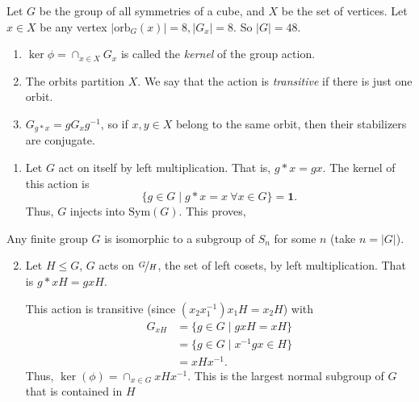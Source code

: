\begin{example}
    Let \(G\) be the group of all symmetries of a cube, and \(X\) be the set of vertices. Let \(x \in X\) be any vertex \(\left\vert \mathrm{orb}_G(x)\right\vert = 8, \left\vert G_x \right\vert =8  \). So \(\left\vert G \right\vert = 48\).
\end{example}
\begin{remark}
    \begin{enumerate}
        \item \(\ker \phi = \cap_{x\in X} G_x\) is called the \textit{kernel} of the group action.
        \item The orbits partition \(X\). We say that the action is \textit{transitive} if there is just one orbit.
        \item \(G_{g*x} = g G_x g^{-1}\), so if \(x,y \in X\) belong to the same orbit, then their stabilizers are conjugate.
    \end{enumerate}
\end{remark}
\begin{example}
    \begin{enumerate}
        \item Let \(G\) act on itself by left multiplication. That is, \(g*x = gx\). The kernel of this action is
    \[
        \{g \in G\mid g*x = x ~\forall x\in G\} = \textbf{1} .
    \]
    Thus, \(G\) injects into \(\mathrm{Sym}(G)\). This proves,
\end{enumerate}
\begin{theorem}
    Any finite group \(G\) is isomorphic to a subgroup of \(S_n\) for some \(n\) (take \(n = \left\vert G \right\vert \)).
\end{theorem}
\begin{enumerate}
    \setcounter{enumi}{1}
\item Let \(H \leq G\), \(G\) acts on \(\nicefrac{G}{H}\), the set of left cosets, by left multiplication. That is \(g*xH = gxH\).

This action is transitive (since \((x_{2}x_1^{-1})x_{1}H = x_2 H \)) with
\begin{align*}
    G_{xH} &= \{g\in G \mid gxH = xH\}\\
    &= \{g\in G \mid x^{-1}gx\in H\}\\
    &= xHx^{-1}.
\end{align*}
Thus, \(\ker(\phi) = \cap_{x\in G} xHx^{-1}\). This is the largest normal subgroup of \(G\) that is contained in \(H\)
\end{enumerate}
\end{example}
